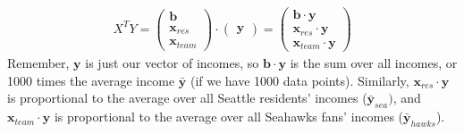\begin{align}
X^T Y = 
\left(\begin{array}{l}
          \mathbf{b} \\
          \mathbf{x}_\mathit{res} \\
          \mathbf{x}_\mathit{team} 
\end{array}\right)
\cdot
\left(\begin{array}{c}
          \mathbf{y}
\end{array}\right)
=
\left(\begin{array}{r}
          \mathbf{b} \cdot \mathbf{y} \\
          \mathbf{x}_\mathit{res} \cdot \mathbf{y} \\
          \mathbf{x}_\mathit{team} \cdot \mathbf{y}  
\end{array}\right)
\end{align}
Remember, $\mathbf{y}$ is just our vector of incomes, so $\mathbf{b} \cdot
\mathbf{y}$ is the sum over all incomes, or 1000 times the average income
$\mathbf{\bar{y}}$  (if we have 1000 data points).  Similarly,
$\mathbf{x}_\mathit{res} \cdot \mathbf{y}$ is proportional to the average over
all Seattle residents' incomes ($\mathbf{\bar{y}}_\mathit{sea})$, and
$\mathbf{x}_\mathit{team} \cdot \mathbf{y}$ is proportional to the average over
all Seahawks fans' incomes ($\mathbf{\bar{y}}_\mathit{hawks}$).\\

